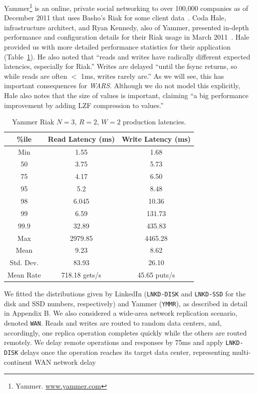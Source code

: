 \documentclass{vldb}
\begin{document}
Yammer\footnote{Yammer. \url{www.yammer.com}} is an online, private
social networking to over 100,000 companies as of December 2011 that
uses Basho's Riak for some client data~\cite{riak}.  Coda Hale,
infrastructure architect, and Ryan Kennedy, also of Yammer, presented
in-depth performance and configuration details for their Riak usage in
March 2011~\cite{riakyammer}.  Hale provided us with more detailed
performance statistics for their application~\cite{codapc}
(Table~\ref{table:yammer}).  He also noted that ``reads and writes
have radically different expected latencies, especially for Riak.''
Writes are delayed ``until the fsync returns, so while reads are often
$<$ 1ms, writes rarely are.''  As we will see, this has important
consequences for \textit{WARS}.  Although we do not model this
explicitly, Hale also notes that the size of values is important,
claiming ``a big performance improvement by adding LZF compression to
values.''

\begin{table}
\centering
\begin{tabular}{|c|c|c|}
\hline
\%ile & Read Latency (ms) & Write Latency (ms)\\
\hline
Min & 1.55 & 1.68\\
50 & 3.75 & 5.73 \\
75 & 4.17 & 6.50\\
95 & 5.2 & 8.48\\
98 & 6.045 & 10.36 \\
99 & 6.59 & 131.73\\
99.9 & 32.89 & 435.83\\
Max & 2979.85 &  4465.28 \\
\hline
Mean & 9.23 & 8.62 \\
Std. Dev. & 83.93 & 26.10\\
\hline
Mean Rate & 718.18 gets/s & 45.65 puts/s\\
\hline
\end{tabular}
\vspace{-4pt}
\caption{Yammer Riak $N$$=$$3$, $R$$=$$2$, $W$$=$$2$ production latencies.}
\vspace{-6pt}
\label{table:yammer}
\end{table}

We fitted the distributions given by LinkedIn (\texttt{LNKD-DISK} and
\texttt{LNKD-SSD} for the disk and SSD numbers, respectively) and
Yammer (\texttt{YMMR}), as described in detail in Appendix B. We also
considered a wide-area network replication scenario, denoted
\texttt{WAN}.  Reads and writes are routed to random data centers,
and, accordingly, one replica operation completes quickly while the
others are routed remotely.  We delay remote operations and responses
by 75ms and apply \texttt{LNKD-DISK} delays once the operation reaches
its target data center, representing multi-continent WAN network
delay~\cite{dean-keynote}
\end{document}
